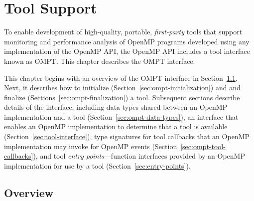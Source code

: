 \newcommand{\ompttype}[1]{\subsubsection{#1}}  %
\newcommand{\ompttoolsignature}[1]{\subsection{#1}}  %
\newcommand{\omptcallbacksignature}[1]{\subsubsection{#1}}  %
\newcommand{\omptruntimeentrypoint}[1]{\subsubsection{#1}}  %
\newcommand{\ompteventswithoutdirectives}[1]{\littleheader{#1}}

\chapter{Tool Support}
\label{chap:ToolsSupport}

To enable development of high-quality, portable, \emph{first-party} tools
that support monitoring and performance analysis of OpenMP programs
developed using any implementation of the OpenMP API, the OpenMP API
includes a tool interface known as OMPT. 
This chapter describes the OMPT interface.

This chapter begins with an overview of the OMPT interface in
Section~\ref{sec:ompt-overview}. Next,
it describes how to initialize (Section~\ref{sec:ompt-initialization}) and 
and finalize (Sections~\ref{sec:ompt-finalization}) a tool.
Subsequent sections describe details of the interface, including
data types shared between an OpenMP implementation and a tool
(Section~\ref{sec:ompt-data-types}), 
an interface that enables an OpenMP implementation to determine that a
tool is available (Section~\ref{sec:tool-interface}),
type signatures for tool callbacks 
that an OpenMP implementation may invoke for OpenMP events
(Section~\ref{sec:ompt-tool-callbacks}), and 
tool \emph{entry points}---function interfaces
provided by an OpenMP implementation for use by a tool
(Section~\ref{sec:entry-points}). 

\section{Overview}
\label{sec:ompt-overview}

